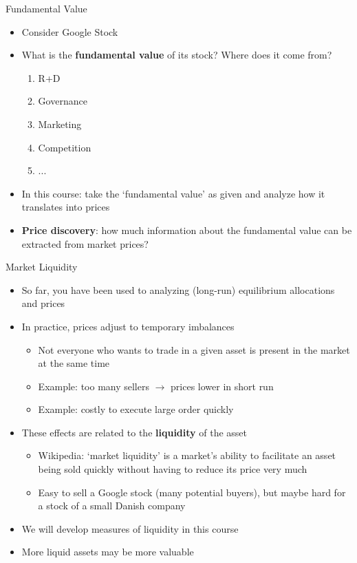 \documentclass[english,10pt
,aspectratio=169
]{beamer}
\begin{document}
\begin{frame}[label=main4]{Fundamental Value}
\begin{itemize}
	\item Consider Google Stock
	\item What is the \textbf{fundamental value} of its stock? Where does it come from?
	\begin{enumerate}
		\item R+D
		\item Governance
		\item Marketing
		\item Competition
		\item ...
	\end{enumerate}
	\item In this course: take the `fundamental value' as given and analyze how it translates into prices
	
	\item \textbf{Price discovery}: how much information about the fundamental value can be extracted from market prices?
	
	\hyperlink{quote}{}
\end{itemize}
\end{frame}


\begin{frame}{Market Liquidity}
\begin{itemize}
	\item So far, you have been used to analyzing (long-run) equilibrium allocations and prices
	\item In practice, prices adjust to temporary imbalances
	\begin{itemize}
		\item Not everyone who wants to trade in a given asset is present in the market at the same time
		\item Example: too many sellers $\rightarrow$ prices lower in short run
		\item Example: costly to execute large order quickly
	\end{itemize}
	\pause
	\item These effects are related to the \textbf{liquidity} of the asset
	\begin{itemize}
		\item Wikipedia: `market liquidity' is a market's ability to facilitate an asset being sold quickly without having to reduce its price very much
		\item Easy to sell a Google stock (many potential buyers), but maybe hard for a stock of a small Danish company
	\end{itemize}
	\item We will develop measures of liquidity in this course
	\item More liquid assets may be more valuable
\end{itemize}
\end{frame}
\end{document}
